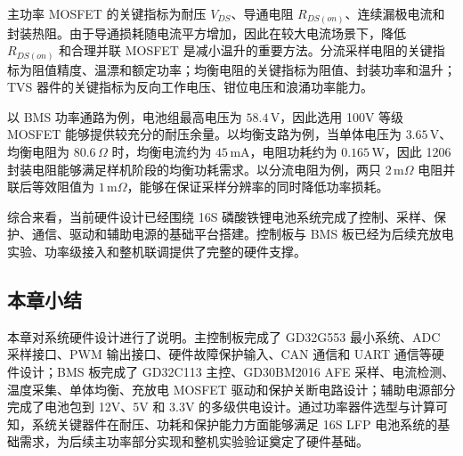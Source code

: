 主功率 MOSFET 的关键指标为耐压 $V_{DS}$、导通电阻 $R_{DS(on)}$、连续漏极电流和封装热阻。由于导通损耗随电流平方增加，因此在较大电流场景下，降低 $R_{DS(on)}$ 和合理并联 MOSFET 是减小温升的重要方法。分流采样电阻的关键指标为阻值精度、温漂和额定功率；均衡电阻的关键指标为阻值、封装功率和温升；TVS 器件的关键指标为反向工作电压、钳位电压和浪涌功率能力。

以 BMS 功率通路为例，电池组最高电压为 $58.4\,\mathrm{V}$，因此选用 100V 等级 MOSFET 能够提供较充分的耐压余量。以均衡支路为例，当单体电压为 $3.65\,\mathrm{V}$、均衡电阻为 $80.6\,\Omega$ 时，均衡电流约为 $45\,\mathrm{mA}$，电阻功耗约为 $0.165\,\mathrm{W}$，因此 1206 封装电阻能够满足样机阶段的均衡功耗需求。以分流电阻为例，两只 $2\,\mathrm{m}\Omega$ 电阻并联后等效阻值为 $1\,\mathrm{m}\Omega$，能够在保证采样分辨率的同时降低功率损耗。

综合来看，当前硬件设计已经围绕 16S 磷酸铁锂电池系统完成了控制、采样、保护、通信、驱动和辅助电源的基础平台搭建。控制板与 BMS 板已经为后续充放电实验、功率级接入和整机联调提供了完整的硬件支撑。

\subsection{本章小结}

本章对系统硬件设计进行了说明。主控制板完成了 GD32G553 最小系统、ADC 采样接口、PWM 输出接口、硬件故障保护输入、CAN 通信和 UART 通信等硬件设计；BMS 板完成了 GD32C113 主控、GD30BM2016 AFE 采样、电流检测、温度采集、单体均衡、充放电 MOSFET 驱动和保护关断电路设计；辅助电源部分完成了电池包到 12V、5V 和 3.3V 的多级供电设计。通过功率器件选型与计算可知，系统关键器件在耐压、功耗和保护能力方面能够满足 16S LFP 电池系统的基础需求，为后续主功率部分实现和整机实验验证奠定了硬件基础。
